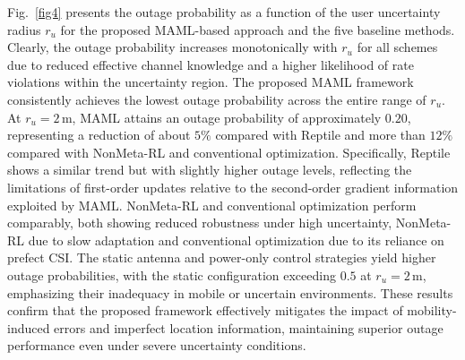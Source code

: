 \documentclass[journal,10pt]{IEEEtran}
\begin{document}
Fig.~\ref{fig4} presents the outage probability as a function of the user uncertainty radius $r_u$ for the proposed MAML-based approach and the five baseline methods. Clearly, the outage probability increases monotonically with $r_u$ for all schemes due to reduced effective channel knowledge and a higher likelihood of rate violations within the uncertainty region. The proposed MAML framework consistently achieves the lowest outage probability across the entire range of $r_u$. At $r_u = 2\,\mathrm{m}$, MAML attains an outage probability of approximately $0.20$, representing a reduction of about $5\%$ compared with Reptile and more than $12\%$ compared with NonMeta-RL and conventional optimization.
Specifically, Reptile shows a similar trend but with slightly higher outage levels, reflecting the limitations of first-order updates relative to the second-order gradient information exploited by MAML. NonMeta-RL and conventional optimization perform comparably, both showing reduced robustness under high uncertainty,  NonMeta-RL due to slow adaptation and conventional optimization due to its reliance on prefect CSI. The static antenna and power-only control strategies yield higher outage probabilities, with the static configuration exceeding $0.5$ at $r_u = 2\,\mathrm{m}$, emphasizing their inadequacy in mobile or uncertain environments. 
These results confirm that the proposed framework effectively mitigates the impact of mobility-induced errors and imperfect location information, maintaining superior outage performance even under severe uncertainty conditions.
\end{document}
